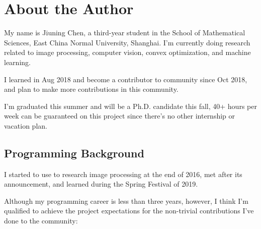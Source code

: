 
\section{About the Author}\label{sec:about_author}

My name is \textsf{Jiuning Chen}, a third-year student in the School of Mathematical Sciences, East China Normal University, Shanghai. I'm currently doing research related to image processing, computer vision, convex optimization, and machine learning.\par

I learned \langjulia in Aug 2018 and become a contributor to \langjulia community since Oct 2018, and plan to make more contributions in this community.\par

I'm graduated this summer and will be a Ph.D. candidate this fall, 40+ hours per week can be guaranteed on this project since there's no other internship or vacation plan.\par

\subsection*{Programming Background}

I started to use \langmatlab to research image processing at the end of 2016, met  \langjulia after its  announcement, and learned \langpython during the Spring Festival of 2019. \par

Although my programming career is less than three years, however, I think I'm qualified to achieve the project expectations for the non-trivial contributions I've done to the \langjulia{} community:

